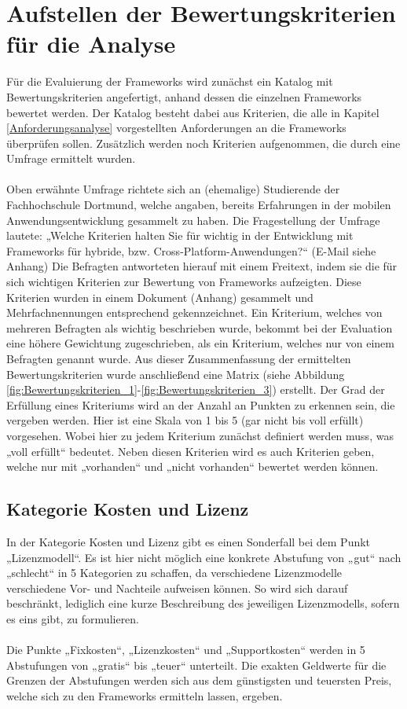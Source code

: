\chapter{Aufstellen der Bewertungskriterien für die Analyse} \label{Bewertungskriterien}

Für die Evaluierung der Frameworks wird zunächst ein Katalog mit Bewertungskriterien angefertigt, anhand dessen die einzelnen Frameworks bewertet werden. Der Katalog besteht dabei aus Kriterien, die alle in Kapitel \ref{Anforderungsanalyse} vorgestellten Anforderungen an die Frameworks überprüfen sollen. Zusätzlich werden noch Kriterien aufgenommen, die durch eine Umfrage ermittelt wurden. 
\\
\\
Oben erwähnte Umfrage richtete sich an (ehemalige) Studierende der Fachhochschule Dortmund, welche angaben, bereits Erfahrungen in der mobilen Anwendungsentwicklung gesammelt zu haben. Die Fragestellung der Umfrage lautete: „Welche Kriterien halten Sie für wichtig in der Entwicklung mit Frameworks für hybride, bzw. Cross-Platform-Anwendungen?“ (E-Mail siehe Anhang) Die Befragten antworteten hierauf mit einem Freitext, indem sie die für sich wichtigen Kriterien zur Bewertung von Frameworks aufzeigten. Diese Kriterien wurden in einem Dokument (Anhang) gesammelt und Mehrfachnennungen entsprechend gekennzeichnet. Ein Kriterium, welches von mehreren Befragten als wichtig beschrieben wurde, bekommt bei der Evaluation eine höhere Gewichtung zugeschrieben, als ein Kriterium, welches nur von einem Befragten genannt wurde. Aus dieser Zusammenfassung der ermittelten Bewertungskriterien wurde anschließend eine Matrix (siehe Abbildung \ref{fig:Bewertungskriterien_1}-\ref{fig:Bewertungskriterien_3}) erstellt. Der Grad der Erfüllung eines Kriteriums wird an der Anzahl an Punkten zu erkennen sein, die vergeben werden. Hier ist eine Skala von 1 bis 5 (gar nicht bis voll erfüllt) vorgesehen. Wobei hier zu jedem Kriterium zunächst definiert werden muss, was „voll erfüllt“ bedeutet. Neben diesen Kriterien wird es auch Kriterien geben, welche nur mit „vorhanden“ und „nicht vorhanden“ bewertet werden können.

\section{Kategorie Kosten und Lizenz} 

In der Kategorie Kosten und Lizenz gibt es einen Sonderfall bei dem Punkt „Lizenzmodell“. Es ist hier nicht möglich eine konkrete Abstufung von „gut“ nach „schlecht“ in 5 Kategorien zu schaffen, da verschiedene Lizenzmodelle verschiedene Vor- und Nachteile aufweisen können. So wird sich darauf beschränkt, lediglich eine kurze Beschreibung des jeweiligen Lizenzmodells, sofern es eins gibt, zu formulieren. 
\\
\\
Die Punkte „Fixkosten“, „Lizenzkosten“ und „Supportkosten“ werden in 5 Abstufungen von „gratis“ bis „teuer“ unterteilt. Die exakten Geldwerte für die Grenzen der Abstufungen werden sich aus dem günstigsten und teuersten Preis, welche sich zu den Frameworks ermitteln lassen, ergeben.

